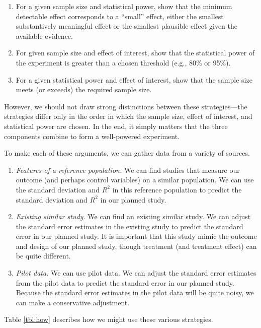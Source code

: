 \documentclass[12pt]{article}
\begin{document}
\begin{enumerate}
\item For a given sample size and statistical power, show that the minimum detectable effect corresponds to a ``small'' effect, either the smallest substantively meaningful effect or the smallest plausible effect given the available evidence.
\item For given sample size and effect of interest, show that the statistical power of the experiment is greater than a chosen threshold (e.g., 80\% or 95\%).
\item For a given statistical power and effect of interest, show that the sample size meets (or exceeds) the required sample size.
\end{enumerate}

\noindent However, we should not draw strong distinctions between these strategies---the strategies differ only in the order in which the sample size, effect of interest, and statistical power are chosen. 
In the end, it simply matters that the three components combine to form a well-powered experiment.

To make each of these arguments, we can gather data from a variety of sources.

\begin{enumerate}
\item \textit{Features of a reference population.} We can find studies that measure our outcome (and perhaps control variables) on a similar population. We can use the standard deviation and $R^2$ in this reference population to predict the standard deviation and $R^2$ in our planned study. 
\item \textit{Existing similar study.} We can find an existing similar study. We can adjust the standard error estimates in the existing study to predict the standard error in our planned study. It is important that this study mimic the outcome and design of our planned study, though treatment (and treatment effect) can be quite different.
\item \textit{Pilot data.} We can use pilot data. We can adjust the standard error estimates from the pilot data to predict the standard error in our planned study. Because the standard error estimates in the pilot data will be quite noisy, we can make a conservative adjustment.
\end{enumerate}

\noindent Table \ref{tbl:how} describes how we might use these various strategies.
\end{document}
